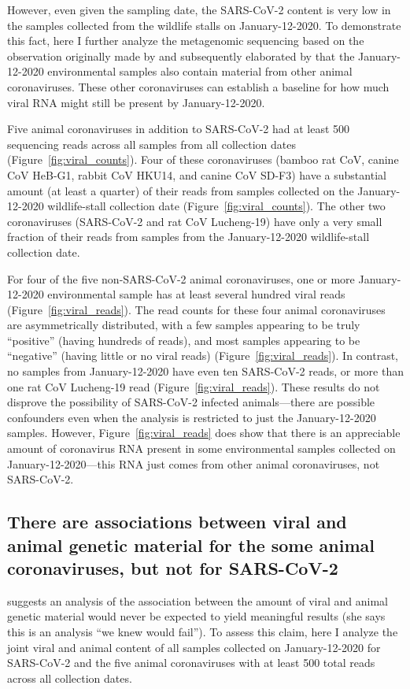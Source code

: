 \documentclass[9pt,twocolumn,twoside]{gsajnl_modified}
\begin{document}
However, even given the sampling date, the SARS-CoV-2 content is very low in the samples collected from the wildlife stalls on January-12-2020.
To demonstrate this fact, here I further analyze the metagenomic sequencing based on the observation originally made by \citet{massey2023animal} and subsequently elaborated by \citet{christoph2023genetic} that the January-12-2020 environmental samples also contain material from other animal coronaviruses.
These other coronaviruses can establish a baseline for how much viral RNA might still be present by January-12-2020.

Five animal coronaviruses in addition to SARS-CoV-2 had at least 500 sequencing reads across all samples from all collection dates (Figure~\ref{fig:viral_counts}).
Four of these coronaviruses (bamboo rat CoV, canine CoV HeB-G1, rabbit CoV HKU14, and canine CoV SD-F3) have a substantial amount (at least a quarter) of their reads from samples collected on the January-12-2020 wildlife-stall collection date (Figure~\ref{fig:viral_counts}).
The other two coronaviruses (SARS-CoV-2 and rat CoV Lucheng-19) have only a very small fraction of their reads from samples from the January-12-2020 wildlife-stall collection date.

For four of the five non-SARS-CoV-2 animal coronaviruses, one or more January-12-2020 environmental sample has at least several hundred viral reads (Figure~\ref{fig:viral_reads}).
The read counts for these four animal coronaviruses are asymmetrically distributed, with a few samples appearing to be truly ``positive'' (having hundreds of reads), and most samples appearing to be ``negative'' (having little or no viral reads) (Figure~\ref{fig:viral_reads}).
In contrast, no samples from January-12-2020 have even ten SARS-CoV-2 reads, or more than one rat CoV Lucheng-19 read (Figure~\ref{fig:viral_reads}).
These results do not disprove the possibility of SARS-CoV-2 infected animals---there are possible confounders even when the analysis is restricted to just the January-12-2020 samples.
However, Figure~\ref{fig:viral_reads} does show that there is an appreciable amount of coronavirus RNA present in some environmental samples collected on January-12-2020---this RNA just comes from other animal coronaviruses, not SARS-CoV-2.

\subsection{There are associations between viral and animal genetic material for the some animal coronaviruses, but not for SARS-CoV-2}
\citet{debarre2024what} suggests an analysis of the association between the amount of viral and animal genetic material would never be expected to yield meaningful results (she says this is an analysis ``we knew would fail'').
To assess this claim, here I analyze the joint viral and animal content of all samples collected on January-12-2020 for SARS-CoV-2 and the five animal coronaviruses with at least 500 total reads across all collection dates.
\end{document}
